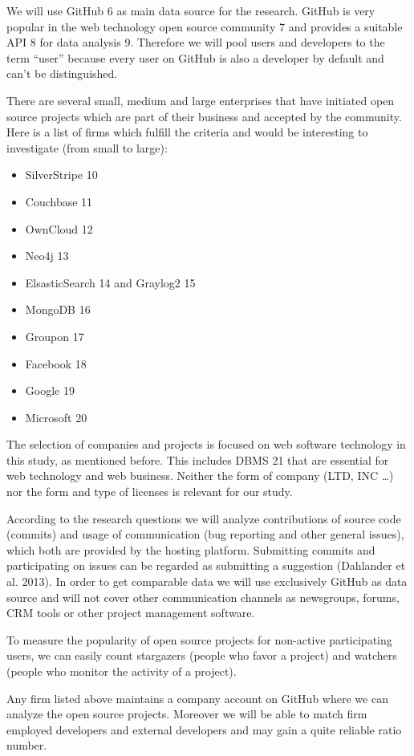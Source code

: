 We will use GitHub 6 as main data source for the research. GitHub is very popular in the web technology open source community 7 and provides a suitable API 8 for data analysis 9. Therefore we will pool users and developers to the term “user” because every user on GitHub is also a developer by default and can't be distinguished.

There are several small, medium and large enterprises that have initiated open source projects which are part of their business and accepted by the community. Here is a list of firms which fulfill the criteria and would be interesting to investigate (from small to large):

\begin{itemize}
	\item SilverStripe 10
	\item Couchbase 11
	\item OwnCloud 12
	\item Neo4j 13
	\item ElsasticSearch 14 and Graylog2 15
	\item MongoDB 16
	\item Groupon 17
	\item Facebook 18
	\item Google 19
	\item Microsoft 20
\end{itemize}

The selection of companies and projects is focused on web software technology in this study, as mentioned before. This includes DBMS 21 that are essential for web technology and web business. Neither the form of company (LTD, INC …) nor the form and type of licenses is relevant for our study.

According to the research questions we will analyze contributions of source code (commits) and usage of communication (bug reporting and other general issues), which both are provided by the hosting platform. Submitting commits and participating on issues can be regarded as submitting a suggestion (Dahlander et al. 2013). In order to get comparable data we will use exclusively GitHub as data source and will not cover other communication channels as newsgroups, forums, CRM tools or other project management software.

To measure the popularity of open source projects for non-active participating users, we can easily count stargazers (people who favor a project) and watchers (people who monitor the activity of a project).

Any firm listed above maintains a company account on GitHub where we can analyze the open source projects. Moreover we will be able to match firm employed developers and external developers and may gain a quite reliable ratio number.

